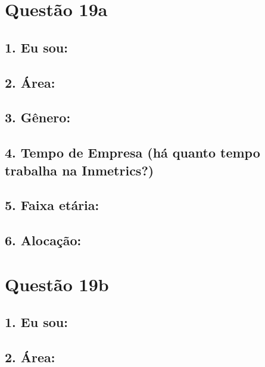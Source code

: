\documentclass[]{book}
\begin{document}
\hypertarget{questao-19a}{%
\section{Questão 19a}\label{questao-19a}}

\hypertarget{eu-sou-45}{%
\subsection{1. Eu sou:}\label{eu-sou-45}}

\hypertarget{area-45}{%
\subsection{2. Área:}\label{area-45}}

\hypertarget{genero-45}{%
\subsection{3. Gênero:}\label{genero-45}}

\hypertarget{tempo-de-empresa-ha-quanto-tempo-trabalha-na-inmetrics-45}{%
\subsection{4. Tempo de Empresa (há quanto tempo trabalha na Inmetrics?)}\label{tempo-de-empresa-ha-quanto-tempo-trabalha-na-inmetrics-45}}

\hypertarget{faixa-etaria-45}{%
\subsection{5. Faixa etária:}\label{faixa-etaria-45}}

\hypertarget{alocacao-45}{%
\subsection{6. Alocação:}\label{alocacao-45}}

\hypertarget{questao-19b}{%
\section{Questão 19b}\label{questao-19b}}

\hypertarget{eu-sou-46}{%
\subsection{1. Eu sou:}\label{eu-sou-46}}

\hypertarget{area-46}{%
\subsection{2. Área:}\label{area-46}}
\end{document}

